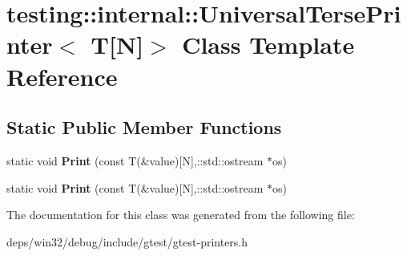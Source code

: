 \hypertarget{classtesting_1_1internal_1_1_universal_terse_printer_3_01_t[_n]_4}{}\section{testing\+:\+:internal\+:\+:Universal\+Terse\+Printer$<$ T\mbox{[}N\mbox{]}$>$ Class Template Reference}
\label{classtesting_1_1internal_1_1_universal_terse_printer_3_01_t[_n]_4}
\subsection*{Static Public Member Functions}
\begin{DoxyCompactItemize}
\item 
\hypertarget{classtesting_1_1internal_1_1_universal_terse_printer_3_01_t[_n]_4_ab86be2fbff7bb8fb2113e9ade3899a56}{}static void {\bfseries Print} (const T(\&value)\mbox{[}N\mbox{]},\+::std\+::ostream $\ast$os)\label{classtesting_1_1internal_1_1_universal_terse_printer_3_01_t[_n]_4_ab86be2fbff7bb8fb2113e9ade3899a56}

\item 
\hypertarget{classtesting_1_1internal_1_1_universal_terse_printer_3_01_t[_n]_4_ab86be2fbff7bb8fb2113e9ade3899a56}{}static void {\bfseries Print} (const T(\&value)\mbox{[}N\mbox{]},\+::std\+::ostream $\ast$os)\label{classtesting_1_1internal_1_1_universal_terse_printer_3_01_t[_n]_4_ab86be2fbff7bb8fb2113e9ade3899a56}

\end{DoxyCompactItemize}


The documentation for this class was generated from the following file\+:\begin{DoxyCompactItemize}
\item 
deps/win32/debug/include/gtest/gtest-\/printers.\+h\end{DoxyCompactItemize}
